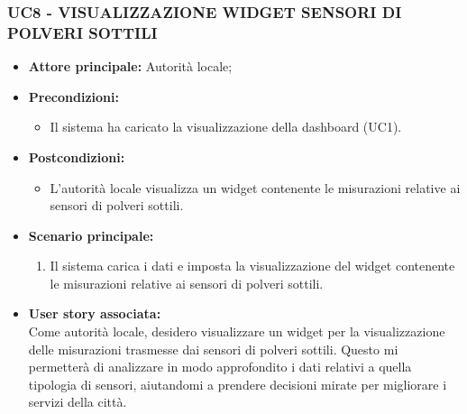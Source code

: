 \subsubsection{UC8 - VISUALIZZAZIONE WIDGET SENSORI DI POLVERI SOTTILI}
\begin{itemize}
    \item \textbf{Attore principale:} Autorità locale;
    \item \textbf{Precondizioni:}
        \begin{itemize}
            \item Il sistema ha caricato la visualizzazione della dashboard (UC1).
        \end{itemize}
    \item \textbf{Postcondizioni:}
        \begin{itemize}
            \item L'autorità locale visualizza un widget contenente le misurazioni relative ai sensori di polveri sottili.
        \end{itemize}
    \item \textbf{Scenario principale:}
        \begin{enumerate}
            \item Il sistema carica i dati e imposta la visualizzazione del widget contenente le misurazioni relative ai sensori di polveri sottili.
        \end{enumerate}
    \item \textbf{User story associata:} \\
        Come autorità locale, desidero visualizzare un widget per la visualizzazione delle misurazioni trasmesse dai sensori di polveri sottili. Questo mi permetterà di analizzare in modo approfondito i dati relativi a quella tipologia di sensori, aiutandomi a prendere decisioni mirate per migliorare i servizi della città.
\end{itemize}